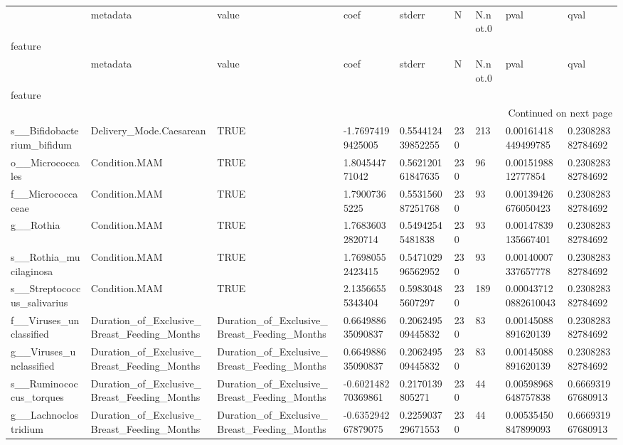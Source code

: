 \begin{longtable}{lllllllll}
\toprule
 & metadata & value & coef & stderr & N & N.not.0 & pval & qval \\
feature &  &  &  &  &  &  &  &  \\
\midrule
\endfirsthead
\toprule
 & metadata & value & coef & stderr & N & N.not.0 & pval & qval \\
feature &  &  &  &  &  &  &  &  \\
\midrule
\endhead
\midrule
\multicolumn{9}{r}{Continued on next page} \\
\midrule
\endfoot
\bottomrule
\endlastfoot
s\_\_Bifidobacterium\_bifidum & Delivery\_Mode.Caesarean & TRUE & -1.76974199425005 & 0.554412439852255 & 230 & 213 & 0.00161418449499785 & 0.230828382784692 \\
o\_\_Micrococcales & Condition.MAM & TRUE & 1.804544771042 & 0.562120161847635 & 230 & 96 & 0.0015198812777854 & 0.230828382784692 \\
f\_\_Micrococcaceae & Condition.MAM & TRUE & 1.79007365225 & 0.553156087251768 & 230 & 93 & 0.00139426676050423 & 0.230828382784692 \\
g\_\_Rothia & Condition.MAM & TRUE & 1.76836032820714 & 0.54942545481838 & 230 & 93 & 0.00147839135667401 & 0.230828382784692 \\
s\_\_Rothia\_mucilaginosa & Condition.MAM & TRUE & 1.76980552423415 & 0.547102996562952 & 230 & 93 & 0.00140007337657778 & 0.230828382784692 \\
s\_\_Streptococcus\_salivarius & Condition.MAM & TRUE & 2.13566555343404 & 0.59830485607297 & 230 & 189 & 0.000437120882610043 & 0.230828382784692 \\
f\_\_Viruses\_unclassified & Duration\_of\_Exclusive\_Breast\_Feeding\_Months & Duration\_of\_Exclusive\_Breast\_Feeding\_Months & 0.664988635090837 & 0.206249509445832 & 230 & 83 & 0.00145088891620139 & 0.230828382784692 \\
g\_\_Viruses\_unclassified & Duration\_of\_Exclusive\_Breast\_Feeding\_Months & Duration\_of\_Exclusive\_Breast\_Feeding\_Months & 0.664988635090837 & 0.206249509445832 & 230 & 83 & 0.00145088891620139 & 0.230828382784692 \\
s\_\_Ruminococcus\_torques & Duration\_of\_Exclusive\_Breast\_Feeding\_Months & Duration\_of\_Exclusive\_Breast\_Feeding\_Months & -0.602148270369861 & 0.2170139805271 & 230 & 44 & 0.00598968648757838 & 0.666931967680913 \\
g\_\_Lachnoclostridium & Duration\_of\_Exclusive\_Breast\_Feeding\_Months & Duration\_of\_Exclusive\_Breast\_Feeding\_Months & -0.635294267879075 & 0.225903729671553 & 230 & 44 & 0.00535450847899093 & 0.666931967680913 \\

\end{longtable}
